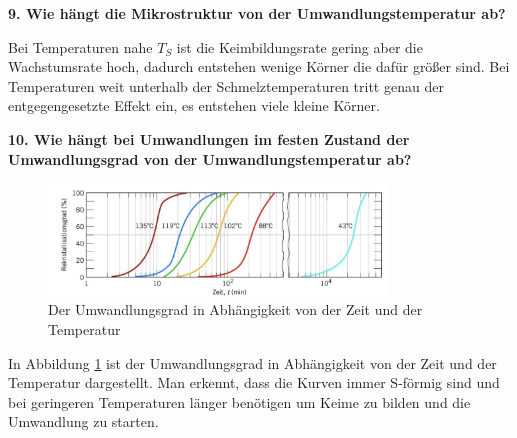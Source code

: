 \noindent\textbf{9. Wie hängt die Mikrostruktur von der Umwandlungstemperatur ab?}\\
\begin{addmargin}[25pt]{0pt}
Bei Temperaturen nahe $T_S$ ist die Keimbildungsrate gering aber die Wachstumsrate hoch, dadurch entstehen wenige Körner die dafür größer sind. Bei Temperaturen weit unterhalb der Schmelztemperaturen tritt genau der entgegengesetzte Effekt ein, es entstehen viele kleine Körner.\\
\end{addmargin}

\noindent\textbf{10. Wie hängt bei Umwandlungen im festen Zustand
der Umwandlungsgrad von der Umwandlungstemperatur ab?}\\
\begin{addmargin}[25pt]{0pt}
\begin{figure}[h]
    \centering
    \includegraphics[width = 0.8\textwidth]{images/Materialwissenschaften/Umwandlungsgrad.jpeg}
    \caption{Der Umwandlungsgrad in Abhängigkeit von der Zeit und der Temperatur}
    \label{fig:Umwandlungsgrad}
\end{figure}
In Abbildung \ref{fig:Umwandlungsgrad} ist der Umwandlungsgrad in Abhängigkeit von der Zeit und der Temperatur dargestellt. Man erkennt, dass die Kurven immer S-förmig sind und bei geringeren Temperaturen länger benötigen um Keime zu bilden und die Umwandlung zu starten. \\
\end{addmargin}

